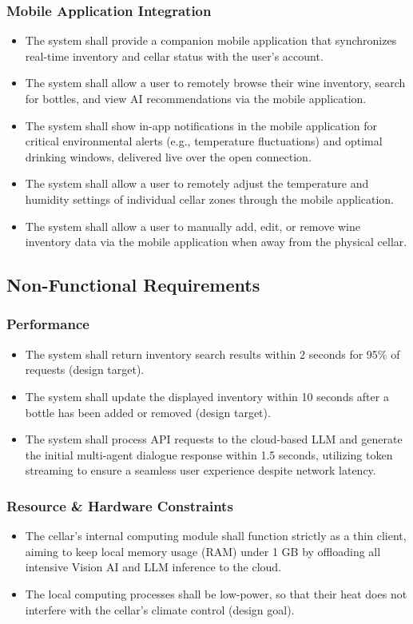 \documentclass[conference]{IEEEtran}
\begin{document}
\subsubsection{Mobile Application Integration}
\begin{itemize}
    \item The system shall provide a companion mobile application that synchronizes real-time inventory and cellar status with the user's account.
    \item The system shall allow a user to remotely browse their wine inventory, search for bottles, and view AI recommendations via the mobile application.
    \item The system shall show in-app notifications in the mobile application for critical environmental alerts (e.g., temperature fluctuations) and optimal drinking windows, delivered live over the open connection.
    \item The system shall allow a user to remotely adjust the temperature and humidity settings of individual cellar zones through the mobile application.
    \item The system shall allow a user to manually add, edit, or remove wine inventory data via the mobile application when away from the physical cellar.
\end{itemize}

\subsection{Non-Functional Requirements}

\subsubsection{Performance}
\begin{itemize}
    \item The system shall return inventory search results within 2 seconds for 95\% of requests (design target).
    \item The system shall update the displayed inventory within 10 seconds after a bottle has been added or removed (design target).
    \item The system shall process API requests to the cloud-based LLM and generate the initial multi-agent dialogue response within 1.5 seconds, utilizing token streaming to ensure a seamless user experience despite network latency.
\end{itemize}

\subsubsection{Resource \& Hardware Constraints}
\begin{itemize}
    \item The cellar's internal computing module shall function strictly as a thin client, aiming to keep local memory usage (RAM) under 1 GB by offloading all intensive Vision AI and LLM inference to the cloud.
    \item The local computing processes shall be low-power, so that their heat does not interfere with the cellar's climate control (design goal).
\end{itemize}
\end{document}
